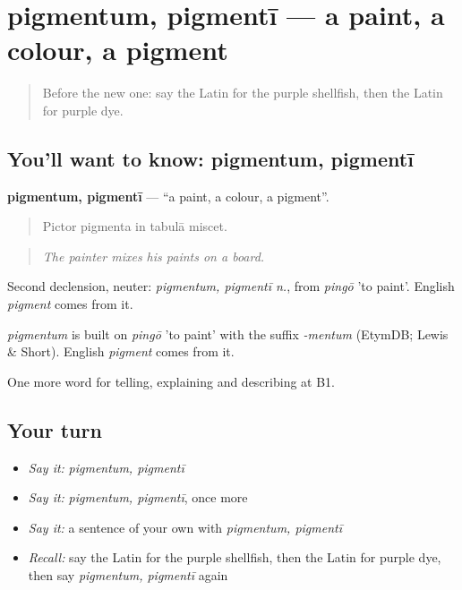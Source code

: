 \section[pigmentum, pigmentī]{pigmentum, pigmentī — a paint, a colour, a pigment}

\label{lesson:LA-C468-pigmentum}



\begin{quote}
Before the new one: say the Latin for the purple shellfish, then the Latin for purple dye.
\end{quote}

\subsection*{You'll want to know: pigmentum, pigmentī}
\textbf{pigmentum, pigmentī} — \textquotedblleft{}a paint, a colour, a pigment\textquotedblright{}.

\begin{quote}
Pictor pigmenta in tabulā miscet.
\end{quote}

\begin{quote}
\emph{The painter mixes his paints on a board.}
\end{quote}

Second declension, neuter: \emph{pigmentum, pigmentī n.}, from \emph{pingō} 'to paint'. English \emph{pigment} comes from it.

\begin{cousinweb}
\emph{pigmentum} is built on \emph{pingō} 'to paint' with the suffix \emph{-mentum} (EtymDB; Lewis \& Short). English \emph{pigment} comes from it.
\end{cousinweb}

\begin{grammarlens}[title={What you've built}]
One more word for telling, explaining and describing at B1.
\end{grammarlens}

\subsection*{Your turn}
\begin{itemize}
\raggedright
  \item \emph{Say it:} \emph{pigmentum, pigmentī}
  \item \emph{Say it:} \emph{pigmentum, pigmentī}, once more
  \item \emph{Say it:} a sentence of your own with \emph{pigmentum, pigmentī}
  \item \emph{Recall:} say the Latin for the purple shellfish, then the Latin for purple dye, then say \emph{pigmentum, pigmentī} again
\end{itemize}

